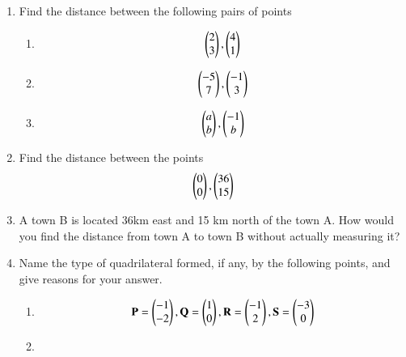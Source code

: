 \renewcommand{\theequation}{\theenumi}
\begin{enumerate}[label=\arabic*.,ref=\thesubsection.\theenumi]
\item Find the distance between the following pairs of points
\begin{enumerate}
\item 
\begin{align}
\begin{pmatrix}2\\3\end{pmatrix}, \begin{pmatrix}4\\1\end{pmatrix}
\end{align}
\item 
\begin{align}
\begin{pmatrix}-5\\7\end{pmatrix}, \begin{pmatrix}-1\\3\end{pmatrix}
\end{align}
\item 
\begin{align}
\begin{pmatrix}a\\b\end{pmatrix}, \begin{pmatrix}-1\\b\end{pmatrix}
\end{align}
\end{enumerate}
\solution

\item Find the distance between the points 
\begin{align}
\begin{pmatrix}0\\0\end{pmatrix}, \begin{pmatrix}36\\15\end{pmatrix}
\end{align}
%
\solution

%
\item A town B is located 36km east and 15 km north of the town A.  How would you find the distance from town A to town B without actually measuring it?
\\
\solution

\item Name the type of quadrilateral formed, if any, by the following points, and give reasons for your answer.
\begin{enumerate}
\item 
\begin{align}
\mathbf{P} = \begin{pmatrix}-1\\-2\end{pmatrix}, \mathbf{Q} =\begin{pmatrix}1\\0\end{pmatrix},
\mathbf{R} =\begin{pmatrix}-1\\2\end{pmatrix}, \mathbf{S} =\begin{pmatrix}-3\\0\end{pmatrix}
\end{align}
\item 
\begin{align}

\end{align}
\end{enumerate}
\end{enumerate}
